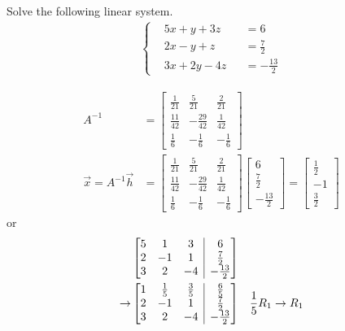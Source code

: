 \begin{Exercise}
Solve the following linear system.
\begin{align*}
\left\{\begin{alignedat}{2}
&5x + y + 3z & &= 6\\
&2x - y + z & &= \frac{7}{2}\\
&3x + 2y - 4z & &= -\frac{13}{2}
\end{alignedat}\right.
\end{align*}
\end{Exercise}
\begin{Answer}
\begin{align*}
A^{-1} &=
\begin{bmatrix}
\frac{1}{21} & \frac{5}{21} & \frac{2}{21}\\
\frac{11}{42} & -\frac{29}{42} & \frac{1}{42}\\
\frac{1}{6} & -\frac{1}{6} & -\frac{1}{6}
\end{bmatrix} \\
\vec{x} =
A^{-1}\vec{h}
&=
\begin{bmatrix}
\frac{1}{21} & \frac{5}{21} & \frac{2}{21}\\
\frac{11}{42} & -\frac{29}{42} & \frac{1}{42}\\
\frac{1}{6} & -\frac{1}{6} & -\frac{1}{6}
\end{bmatrix}
\begin{bmatrix}
6\\
\frac{7}{2}\\
-\frac{13}{2}
\end{bmatrix}
=
\begin{bmatrix}
\frac{1}{2}\\
-1\\
\frac{3}{2}
\end{bmatrix} 
\end{align*}
or
\begin{align*}
&\left[
\begin{array}{@{}ccc|c@{}}
5 & 1 & 3 & 6\\
2 & -1 & 1 & \frac{7}{2}\\
3 & 2 & -4 & -\frac{13}{2}
\end{array}
\right]\\
\to &
\left[
\begin{array}{@{}ccc|c@{}}
1 & \frac{1}{5} & \frac{3}{5} & \frac{6}{5}\\
2 & -1 & 1 & \frac{7}{2}\\
3 & 2 & -4 & -\frac{13}{2}
\end{array}
\right] & \frac{1}{5}R_1 \rightarrow R_1

\end{align*}
\end{Answer}
